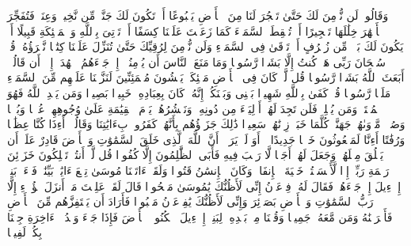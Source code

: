 وَقَالُوا۟ لَن نُّؤۡمِنَ لَكَ حَتَّىٰ تَفۡجُرَ لَنَا مِنَ ٱلۡأَرۡضِ یَنۢبُوعًا%
\stopbuffer%
\startbuffer[\q:17:91]
أَوۡ تَكُونَ لَكَ جَنَّةࣱ مِّن نَّخِیلࣲ وَعِنَبࣲ فَتُفَجِّرَ ٱلۡأَنۡهَٰرَ خِلَٰلَهَا تَفۡجِیرًا%
\stopbuffer%
\startbuffer[\q:17:92]
أَوۡ تُسۡقِطَ ٱلسَّمَاۤءَ كَمَا زَعَمۡتَ عَلَیۡنَا كِسَفًا أَوۡ تَأۡتِیَ بِٱللَّهِ وَٱلۡمَلَٰۤئِكَةِ قَبِیلًا%
\stopbuffer%
\startbuffer[\q:17:93]
أَوۡ یَكُونَ لَكَ بَیۡتࣱ مِّن زُخۡرُفٍ أَوۡ تَرۡقَىٰ فِی ٱلسَّمَاۤءِ وَلَن نُّؤۡمِنَ لِرُقِیِّكَ حَتَّىٰ تُنَزِّلَ عَلَیۡنَا كِتَٰبࣰا نَّقۡرَؤُهُۥۗ قُلۡ سُبۡحَانَ رَبِّی هَلۡ كُنتُ إِلَّا بَشَرࣰا رَّسُولࣰا%
\stopbuffer%
\startbuffer[\q:17:94]
وَمَا مَنَعَ ٱلنَّاسَ أَن یُؤۡمِنُوۤا۟ إِذۡ جَاۤءَهُمُ ٱلۡهُدَىٰۤ إِلَّاۤ أَن قَالُوۤا۟ أَبَعَثَ ٱللَّهُ بَشَرࣰا رَّسُولࣰا%
\stopbuffer%
\startbuffer[\q:17:95]
قُل لَّوۡ كَانَ فِی ٱلۡأَرۡضِ مَلَٰۤئِكَةࣱ یَمۡشُونَ مُطۡمَئِنِّینَ لَنَزَّلۡنَا عَلَیۡهِم مِّنَ ٱلسَّمَاۤءِ مَلَكࣰا رَّسُولࣰا%
\stopbuffer%
\startbuffer[\q:17:96]
قُلۡ كَفَىٰ بِٱللَّهِ شَهِیدَۢا بَیۡنِی وَبَیۡنَكُمۡۚ إِنَّهُۥ كَانَ بِعِبَادِهِۦ خَبِیرَۢا بَصِیرࣰا%
\stopbuffer%
\startbuffer[\q:17:97]
وَمَن یَهۡدِ ٱللَّهُ فَهُوَ ٱلۡمُهۡتَدِۖ وَمَن یُضۡلِلۡ فَلَن تَجِدَ لَهُمۡ أَوۡلِیَاۤءَ مِن دُونِهِۦۖ وَنَحۡشُرُهُمۡ یَوۡمَ ٱلۡقِیَٰمَةِ عَلَىٰ وُجُوهِهِمۡ عُمۡیࣰا وَبُكۡمࣰا وَصُمࣰّاۖ مَّأۡوَىٰهُمۡ جَهَنَّمُۖ كُلَّمَا خَبَتۡ زِدۡنَٰهُمۡ سَعِیرࣰا%
\stopbuffer%
\startbuffer[\q:17:98]
ذَٰلِكَ جَزَاۤؤُهُم بِأَنَّهُمۡ كَفَرُوا۟ بِءَایَٰتِنَا وَقَالُوۤا۟ أَءِذَا كُنَّا عِظَٰمࣰا وَرُفَٰتًا أَءِنَّا لَمَبۡعُوثُونَ خَلۡقࣰا جَدِیدًا%
\stopbuffer%
\startbuffer[\q:17:99]
۞ أَوَ لَمۡ یَرَوۡا۟ أَنَّ ٱللَّهَ ٱلَّذِی خَلَقَ ٱلسَّمَٰوَٰتِ وَٱلۡأَرۡضَ قَادِرٌ عَلَىٰۤ أَن یَخۡلُقَ مِثۡلَهُمۡ وَجَعَلَ لَهُمۡ أَجَلࣰا لَّا رَیۡبَ فِیهِ فَأَبَى ٱلظَّٰلِمُونَ إِلَّا كُفُورࣰا%
\stopbuffer%
\startbuffer[\q:17:100]
قُل لَّوۡ أَنتُمۡ تَمۡلِكُونَ خَزَاۤئِنَ رَحۡمَةِ رَبِّیۤ إِذࣰا لَّأَمۡسَكۡتُمۡ خَشۡیَةَ ٱلۡإِنفَاقِۚ وَكَانَ ٱلۡإِنسَٰنُ قَتُورࣰا%
\stopbuffer%
\startbuffer[\q:17:101]
وَلَقَدۡ ءَاتَیۡنَا مُوسَىٰ تِسۡعَ ءَایَٰتِۭ بَیِّنَٰتࣲۖ فَسۡءَلۡ بَنِیۤ إِسۡرَٰۤءِیلَ إِذۡ جَاۤءَهُمۡ فَقَالَ لَهُۥ فِرۡعَوۡنُ إِنِّی لَأَظُنُّكَ یَٰمُوسَىٰ مَسۡحُورࣰا%
\stopbuffer%
\startbuffer[\q:17:102]
قَالَ لَقَدۡ عَلِمۡتَ مَاۤ أَنزَلَ هَٰۤؤُلَاۤءِ إِلَّا رَبُّ ٱلسَّمَٰوَٰتِ وَٱلۡأَرۡضِ بَصَاۤئِرَ وَإِنِّی لَأَظُنُّكَ یَٰفِرۡعَوۡنُ مَثۡبُورࣰا%
\stopbuffer%
\startbuffer[\q:17:103]
فَأَرَادَ أَن یَسۡتَفِزَّهُم مِّنَ ٱلۡأَرۡضِ فَأَغۡرَقۡنَٰهُ وَمَن مَّعَهُۥ جَمِیعࣰا%
\stopbuffer%
\startbuffer[\q:17:104]
وَقُلۡنَا مِنۢ بَعۡدِهِۦ لِبَنِیۤ إِسۡرَٰۤءِیلَ ٱسۡكُنُوا۟ ٱلۡأَرۡضَ فَإِذَا جَاۤءَ وَعۡدُ ٱلۡءَاخِرَةِ جِئۡنَا بِكُمۡ لَفِیفࣰا%
